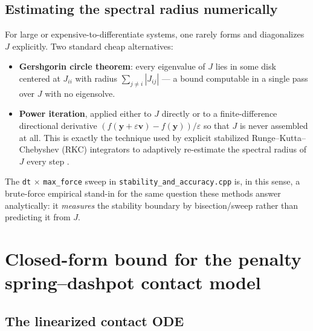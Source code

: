 \documentclass[11pt]{article}
\begin{document}
\subsection{Estimating the spectral radius numerically}

For large or expensive-to-differentiate systems, one rarely forms and diagonalizes $J$
explicitly. Two standard cheap alternatives:

\begin{itemize}
  \item \textbf{Gershgorin circle theorem}: every eigenvalue of $J$ lies in some disk
    centered at $J_{ii}$ with radius $\sum_{j \ne i} |J_{ij}|$ — a bound computable in a
    single pass over $J$ with no eigensolve.
  \item \textbf{Power iteration}, applied either to $J$ directly or to a finite-difference
    directional derivative $(f(\mathbf{y}+\varepsilon \mathbf{v}) - f(\mathbf{y}))/\varepsilon$
    so that $J$ is never assembled at all. This is exactly the technique used by explicit
    stabilized Runge--Kutta--Chebyshev (RKC) integrators to adaptively re-estimate the
    spectral radius of $J$ every step \cite{sommeijershampineverwer1997}.
\end{itemize}

The \texttt{dt} $\times$ \texttt{max\_force} sweep in \texttt{stability\_and\_accuracy.cpp}
is, in this sense, a brute-force empirical stand-in for the same question these methods
answer analytically: it \emph{measures} the stability boundary by bisection/sweep rather
than predicting it from $J$.

\section{Closed-form bound for the penalty spring--dashpot contact model}

\subsection{The linearized contact ODE}
\end{document}
